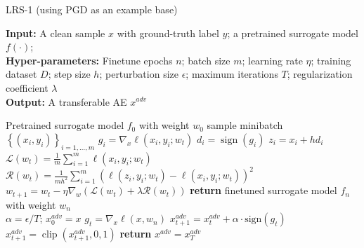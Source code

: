 \documentclass[letterpaper]{article} %
\theoremstyle{plain}
\theoremstyle{definition}
\begin{document}
\begin{algorithm}[t]
\caption{LRS-1 (using PGD as an example base)}
\label{alg}
\begin{flushleft}
    \textbf{Input:} A clean sample $x$ with ground-truth label $y$; a pretrained surrogate model $f(\cdot)$;\\
    \textbf{Hyper-parameters:} Finetune epochs $n$; batch size $m$; learning rate $\eta$; training dataset $D$; step size $h$; perturbation size $\epsilon$; maximum iterations $T$;  regularization coefficient $\lambda$\\
    \textbf{Output:} A transferable AE $x^{adv}$
\end{flushleft}
\begin{algorithmic}[1]
    \State Pretrained surrogate model $f_0$ with weight $w_0$
        \State sample minibatch $\left\{\left(x_{i}, y_{i}\right)\right\}_{i=1, \ldots, m}$
        \State $g_{i}=\nabla_x \ell\left(x_{i}, y_{i} ; w_t\right)$
        \State $d_{i}=\operatorname{sign}(g_{i})$
        \State $z_{i}=x_{i}+h d_{i}$
        \State $\mathcal{L}(w_t)=\frac{1}{m} \sum_{i=1}^m \ell\left(x_i, y_i ; w_t\right)$
        \State $\mathcal{R}(w_t)=\frac{1}{mh^2} \sum_{i=1}^m \left(\ell\left(z_i, y_i ; w_t\right)-\ell\left(x_i, y_i ; w_t\right)\right)^2$
        \State $w_{t+1} = w_t-\eta \nabla_w\left(\mathcal{L}\left(w_t\right)+\lambda \mathcal{R}\left(w_t\right)\right)$
    \EndFor
    \EndFor
    \State \textbf{return} finetuned surrogate model $f_n$ with weight $w_n$
    \[\]
    \State $\alpha=\epsilon/T$; $x_{0}^{adv}=x$
        \State $g_t=\nabla_{x} \ell(x, w_n)$
        \State $x_{t+1}^{adv} = x_t^{adv} + \alpha \cdot \text{sign}(g_{t})$
        \State $x_{t+1}^{adv} = \operatorname{clip}\left(x_{t+1}^{adv}, 0,1\right)$
    \EndFor
    \State \textbf{return} $x^{adv}=x_{T}^{adv}$
\end{algorithmic}

\end{algorithm}
\end{document}
